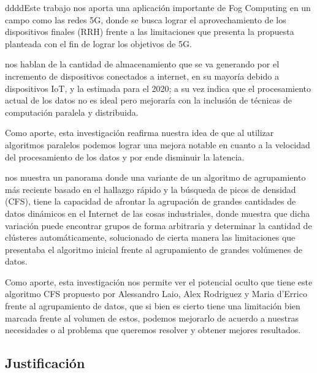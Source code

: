         ddddEste trabajo nos aporta una aplicación importante de Fog Computing en un campo como las redes 5G, donde se busca lograr el aprovechamiento de los dispositivos finales (RRH) frente a las limitaciones que presenta la propuesta planteada con el fin de lograr los objetivos de 5G.\par     
        \vskip 0.3cm
        {\bf\cite{piccialli2018}} nos hablan de la cantidad de almacenamiento que se va generando por el incremento de dispositivos conectados a internet, en su mayoría debido a dispositivos IoT, y la estimada para el 2020; a su vez indica que el procesamiento actual de los datos no es ideal pero mejoraría con la inclusión de técnicas de computación paralela y distribuida.\par
        Como aporte, esta investigación reafirma nuestra idea de que al utilizar algoritmos paralelos podemos lograr una mejora notable en cuanto a la velocidad del procesamiento de los datos y por ende disminuir la latencia. \par
        \vskip 0.3cm
        {\bf\cite{shanmugapriya2018}} nos muestra un panorama donde una variante de un algoritmo de agrupamiento más reciente basado en el hallazgo rápido y la búsqueda de picos de densidad (CFS), tiene la capacidad de afrontar la agrupación de grandes cantidades de datos dinámicos en el Internet de las cosas industriales, donde muestra que dicha variación puede encontrar grupos de forma arbitraria y determinar la cantidad de clústeres automáticamente, solucionado de cierta manera las limitaciones que presentaba el algoritmo inicial frente al agrupamiento de grandes volúmenes de datos.\par
        Como aporte, esta investigación nos permite ver el potencial oculto que tiene este algoritmo CFS propuesto por Alessandro Laio, Alex Rodriguez y Maria d’Errico frente al agrupamiento de datos, que si bien es cierto tiene una limitación bien marcada frente al volumen de estos, podemos mejorarlo de acuerdo a nuestras necesidades o al problema que queremos resolver y obtener mejores resultados.\par

    \subsection{Justificación}
